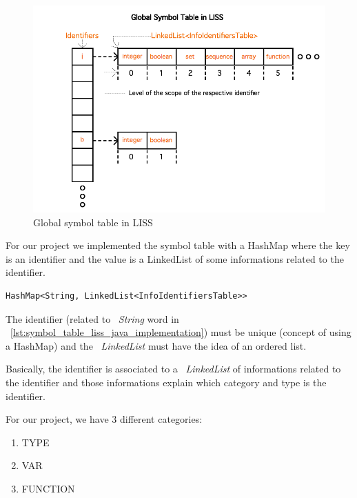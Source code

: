\documentclass[
  oneside,
  11pt, a4paper,
  footinclude=true,
  headinclude=true,
  cleardoublepage=empty
]{scrbook}
\begin{document}
\begin{figure}[h!]
  \centering
    \includegraphics[width=1\textwidth]{img/global_symbol_table.png}
    \caption{Global symbol table in LISS}
    \label{fig:global_symbol_table_liss}
\end{figure}

For our project we implemented the symbol table with a HashMap where the key is an identifier and the value is a LinkedList of some informations related to the identifier.

\begin{lstlisting}[caption={Data structure of the symbol table in LISS},label={lst:symbol_table_liss_java_implementation}]
	HashMap<String, LinkedList<InfoIdentifiersTable>>
\end{lstlisting}

The identifier (related to ~\textit{String} word in ~\ref{lst:symbol_table_liss_java_implementation}) must be unique (concept of using a HashMap) and the ~\textit{LinkedList} must have the idea of an ordered list.

Basically, the identifier is associated to a ~\textit{LinkedList} of informations related to the identifier and those informations explain which category and type is the identifier.

For our project, we have 3 different categories:
\begin{enumerate}
\item TYPE
\item VAR
\item FUNCTION
\end{enumerate}
\end{document}
